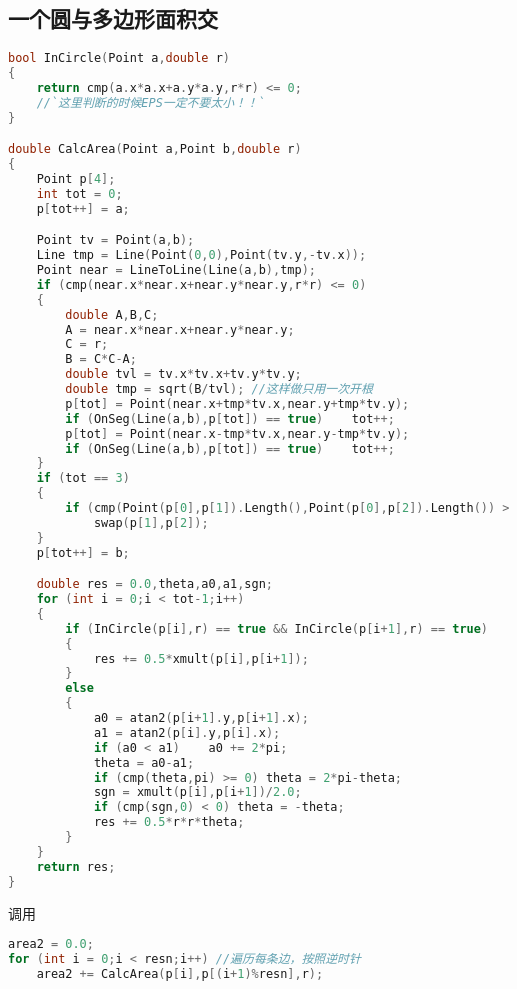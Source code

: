 \subsection{一个圆与多边形面积交}
	\begin{lstlisting}[language=c++]
bool InCircle(Point a,double r)
{
	return cmp(a.x*a.x+a.y*a.y,r*r) <= 0; 
	//`这里判断的时候EPS一定不要太小！！`
}

double CalcArea(Point a,Point b,double r)
{
	Point p[4];
	int tot = 0;
	p[tot++] = a;

	Point tv = Point(a,b);
	Line tmp = Line(Point(0,0),Point(tv.y,-tv.x));
	Point near = LineToLine(Line(a,b),tmp);
	if (cmp(near.x*near.x+near.y*near.y,r*r) <= 0)
	{
		double A,B,C;
		A = near.x*near.x+near.y*near.y;
		C = r;
		B = C*C-A;
		double tvl = tv.x*tv.x+tv.y*tv.y;
		double tmp = sqrt(B/tvl); //这样做只用一次开根
		p[tot] = Point(near.x+tmp*tv.x,near.y+tmp*tv.y);
		if (OnSeg(Line(a,b),p[tot]) == true)	tot++;
		p[tot] = Point(near.x-tmp*tv.x,near.y-tmp*tv.y);
		if (OnSeg(Line(a,b),p[tot]) == true)	tot++;
	}
	if (tot == 3)
	{
		if (cmp(Point(p[0],p[1]).Length(),Point(p[0],p[2]).Length()) > 0)
			swap(p[1],p[2]);
	}
	p[tot++] = b;

	double res = 0.0,theta,a0,a1,sgn;
	for (int i = 0;i < tot-1;i++)
	{
		if (InCircle(p[i],r) == true && InCircle(p[i+1],r) == true)
		{
			res += 0.5*xmult(p[i],p[i+1]);
		}
		else
		{
			a0 = atan2(p[i+1].y,p[i+1].x);
			a1 = atan2(p[i].y,p[i].x);
			if (a0 < a1)	a0 += 2*pi;
			theta = a0-a1;
			if (cmp(theta,pi) >= 0) theta = 2*pi-theta;
			sgn = xmult(p[i],p[i+1])/2.0;
			if (cmp(sgn,0) < 0) theta = -theta;
			res += 0.5*r*r*theta;
		}
	}
	return res;
}
	\end{lstlisting}
	调用
	\begin{lstlisting}[language=c++]
area2 = 0.0;
for (int i = 0;i < resn;i++) //遍历每条边，按照逆时针
	area2 += CalcArea(p[i],p[(i+1)%resn],r);
	\end{lstlisting}
